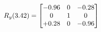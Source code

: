 \documentclass[preview]{standalone}
\begin{document}
\begin{align*}
\special{dvisvgm:raw <g id='unique000'>}R_{y}(3.42) = \begin{bmatrix}-0.96 & 0 & -0.28 \\0 & 1 & 0 \\+0.28 & 0 & -0.96\end{bmatrix}\special{dvisvgm:raw </g>}
\end{align*}
\end{document}

